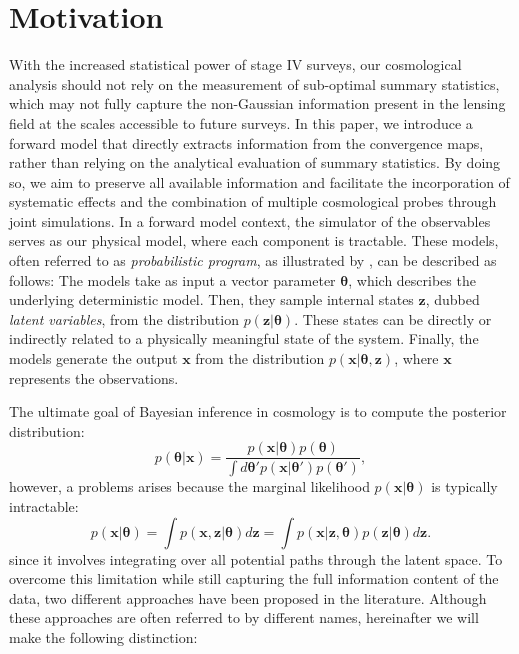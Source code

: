 \documentclass{aa}
\begin{document}
\section{Motivation}\label{Sec:Motivation}
With the increased statistical power of stage IV surveys, our cosmological analysis should not rely on the measurement of sub-optimal summary statistics, which may not fully capture the non-Gaussian information present in the lensing field at the scales accessible to future surveys. In this paper, we introduce a forward model that directly extracts information from the convergence maps, rather than relying on the analytical evaluation of summary statistics. By doing so, we aim to preserve all available information and facilitate the incorporation of systematic effects and the combination of multiple cosmological probes through joint simulations.
In a forward model context, the simulator of the observables serves as our physical model, where each component is tractable. These models, often referred to as \textit{probabilistic program}, as illustrated by \citet{cranmer2020frontier}, can be described as follows: The models take as input a vector parameter $\bm{\theta}$, which describes the underlying deterministic model. Then, they sample internal states $\bm{z}$, dubbed \textit{latent variables}, from the distribution $p(\bm{z}|\bm \theta)$. These states can be directly or indirectly related to a physically meaningful state of the system. Finally, the models generate the output $\bm x$ from the distribution $p(\bm x|\bm \theta,\bm{z})$, where $\bm{x}$ represents the observations. 


The ultimate goal of Bayesian inference in cosmology is to compute the posterior distribution:
\begin{equation}\label{Eq:posterior}
     p(\bm{\theta}|\bm{x})= 
     \frac{p(\bm{x}|\bm{\theta})p(\bm{\theta})}
     {\int d\bm{\theta'}p(\bm{x}|\bm{\theta}')p(\bm{\theta}')},
\end{equation}
however, a problems arises because the marginal likelihood $p(\bm{x}|\bm{\theta})$ is typically intractable:
\begin{equation}
    p(\bm{x}|\bm{\theta})=\int p(\bm{x},\bm{z}|\bm{\theta}) d\bm{z}=\int p(\bm{x}|\bm{z},\bm{\theta})p(\bm{z}|\bm{\theta}) d\bm{z}.
\end{equation}
since it involves integrating over all potential paths through the latent space.
To overcome this limitation while still capturing the full information content of the data, two different approaches have been proposed in the literature. Although these approaches are often referred to by different names, hereinafter we will make the following distinction:
\end{document}
